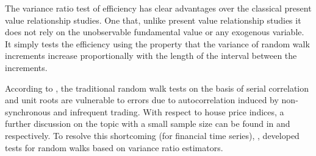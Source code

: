 \documentclass[AEJ,reqno, draftmode]{AEA}
\begin{document}
The variance ratio test of efficiency has clear advantages over the classical present value relationship studies. One that, unlike present value relationship studies it does not rely on the unobservable fundamental value or any exogenous variable. It simply tests the efficiency using the property that the variance of random walk increments increase proportionally with the length of the interval between the increments.


According to \citet{schindler2014persistence}, the traditional random walk tests on the basis of serial correlation and unit roots are vulnerable to errors due to autocorrelation induced by non-synchronous and infrequent trading. With respect to house price indices, a further discussion on the topic with a small sample size can be found in \citet{karl1989efficiency} and \citet{kuo1996serial} respectively. To resolve this shortcoming (for financial time series), \citep{lo1988stock}, \citep{lo1989size} developed tests for random walks based on variance ratio estimators.
\end{document}
